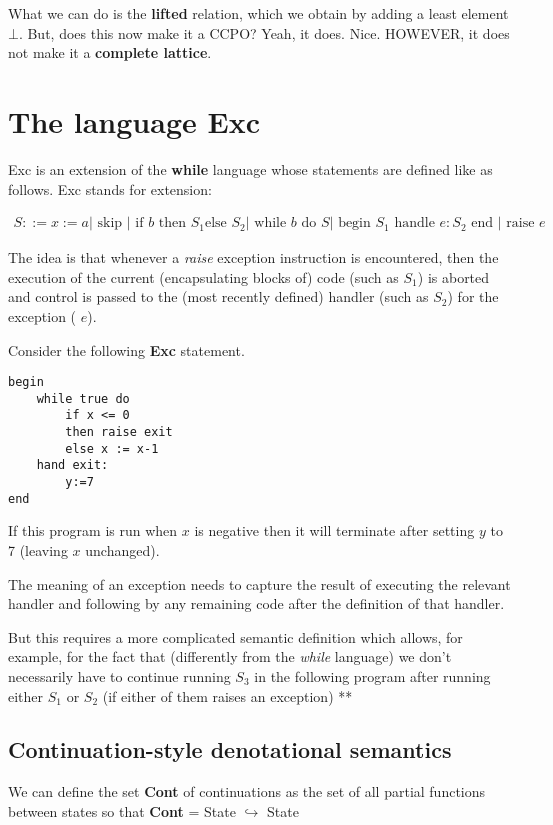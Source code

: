 \documentclass[11pt,a4paper,titlepage,dvipsnames,cmyk]{scrartcl}
\newcommand\pfun{\hookrightarrow}
\begin{document}
What we can do is the \textbf{lifted} relation, which we obtain by adding
a least element $\bot$. But, does this now make it a CCPO? Yeah, it does.
Nice. HOWEVER, it does not make it a \textbf{complete lattice}.

\section{The language Exc}%
\label{sec:exc-language}
Exc is an extension of the \textbf{while} language whose statements are
defined like as follows. Exc stands for extension:

\begin{align*}
    S ::= x := a | \text{ skip } | \text{ if }b\text{ then } S_1 \text{
    else } S_2 | \text{ while } b \text{ do } S | \text{ begin } S_1
    \text{ handle } e : S_2 \text{ end } | \text{ raise } e
\end{align*}

The idea is that whenever a {\color{green} \textit{raise}} exception
instruction is encountered, then the execution of the current
(encapsulating blocks of) code (such as {\color{blue} $S_1$}) is aborted
and control is passed to the (most recently defined) handler (such as
{\color{blue} $S_2$}) for the exception ({\color{blue} $e$}).

Consider the following \textbf{Exc} statement.
\begin{lstlisting}
begin
    while true do
        if x <= 0
        then raise exit
        else x := x-1
    hand exit:
        y:=7
end
\end{lstlisting}

If this program is run when $x$ is negative then it will terminate after
setting $y$ to 7 (leaving $x$ unchanged).

The meaning of an exception needs to capture the result of executing the
relevant handler and following by any remaining code after the definition
of that handler.

But this requires a more complicated semantic definition which allows, for
example, for the fact that (differently from the \textit{while} language)
we don't necessarily have to continue running $S_3$ in the following
program after running either $S_1$ or $S_2$ (if either of them raises an
exception) ** %

\subsection{Continuation-style denotational semantics}%
\label{sub:continuation-style}
We can define the set {\color{red}\textbf{Cont}} of continuations as the
set of all partial functions between states so that
{\color{red}\textbf{Cont}} = {\color{red}State} $\pfun$ {\color{red}State}
\end{document}
